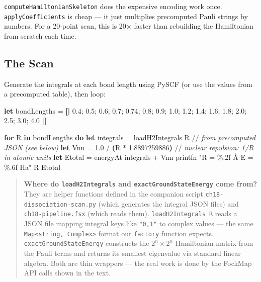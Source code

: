\documentclass[
  11pt,
  oneside]{book}
\newenvironment{Shaded}{\begin{snugshade}}{\end{snugshade}}
\newcommand{\CommentTok}[1]{\textcolor[rgb]{0.56,0.35,0.01}{\textit{#1}}}
\newcommand{\FloatTok}[1]{\textcolor[rgb]{0.00,0.00,0.81}{#1}}
\newcommand{\KeywordTok}[1]{\textcolor[rgb]{0.13,0.29,0.53}{\textbf{#1}}}
\newcommand{\NormalTok}[1]{#1}
\newcommand{\OperatorTok}[1]{\textcolor[rgb]{0.81,0.36,0.00}{\textbf{#1}}}
\newcommand{\StringTok}[1]{\textcolor[rgb]{0.31,0.60,0.02}{#1}}
\begin{document}
\texttt{computeHamiltonianSkeleton} does the expensive encoding work
once. \texttt{applyCoefficients} is cheap --- it just multiplies
precomputed Pauli strings by numbers. For a 20-point scan, this is 20$\times$
faster than rebuilding the Hamiltonian from scratch each time.

\subsection{The Scan}\label{the-scan}

Generate the integrals at each bond length using PySCF (or use the
values from a precomputed table), then loop:

\begin{Shaded}
\begin{Highlighting}[]
\KeywordTok{let}\NormalTok{ bondLengths = }\OperatorTok{[|} \FloatTok{0.4}\NormalTok{; }\FloatTok{0.5}\NormalTok{; }\FloatTok{0.6}\NormalTok{; }\FloatTok{0.7}\NormalTok{; }\FloatTok{0.74}\NormalTok{; }\FloatTok{0.8}\NormalTok{; }\FloatTok{0.9}\NormalTok{; }\FloatTok{1.0}\NormalTok{;}
                     \FloatTok{1.2}\NormalTok{; }\FloatTok{1.4}\NormalTok{; }\FloatTok{1.6}\NormalTok{; }\FloatTok{1.8}\NormalTok{; }\FloatTok{2.0}\NormalTok{; }\FloatTok{2.5}\NormalTok{; }\FloatTok{3.0}\NormalTok{; }\FloatTok{4.0} \OperatorTok{|]}

\KeywordTok{for}\NormalTok{ R }\KeywordTok{in}\NormalTok{ bondLengths }\KeywordTok{do}
    \KeywordTok{let}\NormalTok{ integrals = loadH2Integrals R   //}\CommentTok{ from precomputed JSON (see below)}
    \KeywordTok{let}\NormalTok{ Vnn = }\FloatTok{1.0}\NormalTok{ / }\OperatorTok{(}\NormalTok{R * }\FloatTok{1.8897259886}\OperatorTok{)}\NormalTok{  //}\CommentTok{ nuclear repulsion: 1/R in atomic units}
    \KeywordTok{let}\NormalTok{ Etotal = energyAt integrals + Vnn}
\NormalTok{    printfn }\StringTok{"R = \%.2f Å   E = \%.6f Ha"}\NormalTok{ R Etotal}
\end{Highlighting}
\end{Shaded}

\begin{quote}
\textbf{Where do \texttt{loadH2Integrals} and
\texttt{exactGroundStateEnergy} come from?} They are helper functions
defined in the companion script \texttt{ch18-dissociation-scan.py}
(which generates the integral JSON files) and
\texttt{ch18-pipeline.fsx} (which reads them).
\texttt{loadH2Integrals\ R} reads a JSON file mapping integral keys like
\texttt{"0,1"} to complex values --- the same
\texttt{Map\textless{}string,\ Complex\textgreater{}} format our
\texttt{factory} function expects. \texttt{exactGroundStateEnergy}
constructs the \(2^n \times 2^n\) Hamiltonian matrix from the Pauli
terms and returns its smallest eigenvalue via standard linear algebra.
Both are thin wrappers --- the real work is done by the FockMap API
calls shown in the text.
\end{quote}
\end{document}
